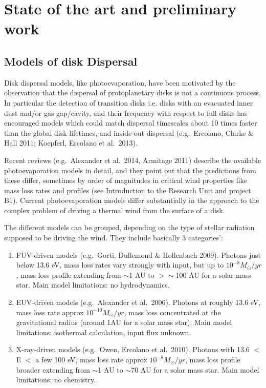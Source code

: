 \documentclass[10pt,fleqn,twoside]{article}
\begin{document}
\section{State of the art and preliminary work}
\renewcommand{\leftmark}{\sc State of the Art and preliminary work}

\subsection{Models of disk Dispersal}

Disk dispersal models, like photoevaporation, have been motivated by
the observation that the dispersal of protoplanetary disks is
not a continuous process. In particular the detection of transition
disks i.e. disks with an evacuated inner dust
and/or gas gap/cavity, and their frequency with respect to full disks
has encouraged models which could match dispersal
timescales about 10 times faster than the global disk
lifetimes, and inside-out dispersal  (e.g.\ Ercolano, Clarke \& Hall 2011;
Koepferl, Ercolano et al.\ 2013). 

Recent reviews (e.g.\ Alexander et al.\ 2014, Armitage 2011) describe
the available photoevaporation models in detail, and they point out that the
predictions from these differ, sometimes by order of magnitudes in
critical wind properties like mass loss rates and profiles (see
Introduction to the Research Unit and project B1). Current
photoevaporation models differ
substantially in the approach to the complex problem of driving a
thermal wind from the surface of a disk. 

The different models can be grouped, depending on
the type of stellar radiation supposed to be driving the wind. They
include basically 3 categories':

\begin{enumerate}
\item FUV-driven models (e.g.\ Gorti, Dullemond \& Hollenbach
  2009). Photons just below 13.6 eV, mass loss rates vary strongly
  with input, but up to $10^{-8}M_{\odot}/yr$, mass
loss profile extending from $\sim$1 AU to  $>\sim$100 AU for a
solar mass star. Main model limitations: no hydrodynamics. 
\item EUV-driven models (e.g.\ Alexander et al.\ 2006). Photons at
  roughly 13.6 eV, mass loss rate approx $10^{-10}M_{\odot}/yr$, mass
loss concentrated at the gravitational radius (around 1AU for a solar
mass star). Main model limitations: isothermal calculation, input flux
unknown. 
\item X-ray-driven models (e.g.\ Owen, Ercolano et al.\ 2010). Photons
  with 13.6 $<$ E $<$ a few 100 eV, mass loss rate approx $10^{-8}M_{\odot}/yr$, mass
loss profile broader extending from $\sim$1 AU to  $\sim$70 AU for a solar
mass star. Main model limitations: no chemistry. 
\end{enumerate}
\end{document}
